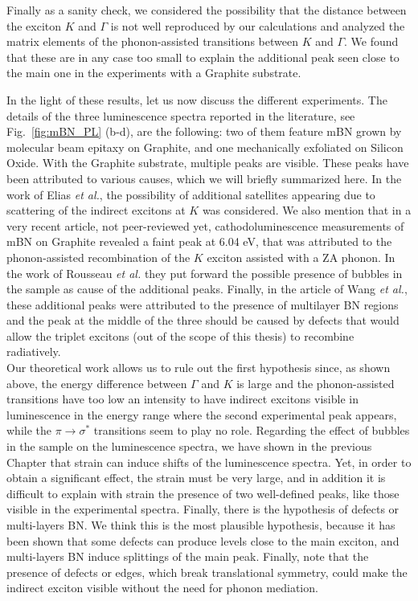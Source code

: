 Finally as a sanity check, we considered the possibility that the distance between the exciton $K$ and $\Gamma$ is not well reproduced by our calculations and analyzed the matrix elements of the phonon-assisted transitions between $K$ and $\Gamma$. We found that these are in any case too small to explain the additional peak seen close to the main one in the experiments with a Graphite substrate.

In the light of these results, let us now discuss the different experiments. The details of the three luminescence spectra reported in the literature, see Fig.~\ref{fig:mBN_PL} (b-d), are the following: two of them feature mBN grown by molecular beam epitaxy on Graphite,\cite{elias2019direct,wang2022scalable} and one mechanically exfoliated on Silicon Oxide.\cite{rousseau2021monolayer}
With the Graphite substrate, multiple peaks are visible.
These peaks have been attributed to various causes, which we will briefly summarized here. In the work of Elias \emph{et al.},\cite{elias2019direct} the possibility of additional satellites appearing due to scattering of the indirect excitons at $K$ was considered. We also mention that in a very recent article, not peer-reviewed yet,\cite{shima2023cathodoluminescence} cathodoluminescence measurements of mBN on Graphite revealed a faint peak at 6.04 eV, that was attributed to the phonon-assisted recombination of the $K$ exciton assisted with a ZA phonon.
In the work of Rousseau \emph{et al.}\cite{rousseau2021monolayer} they put forward the possible presence of bubbles in the sample as cause of the additional peaks. 
Finally, in the article of Wang \emph{et al.}\cite{wang2022scalable}, these additional peaks were attributed to the presence of multilayer BN regions and the peak at the middle of the three should be caused by defects that would allow the triplet excitons (out of the scope of this thesis) to recombine radiatively. \\


Our theoretical work allows us to rule out the first hypothesis since, as shown above, the energy difference between $\Gamma$ and $K$ is large and the phonon-assisted transitions have too low an intensity to have indirect excitons visible in luminescence in the energy range where the second experimental peak appears, while the $\pi\rightarrow\sigma^*$ transitions seem to play no role. Regarding the effect of bubbles in the sample on the luminescence spectra, we have shown in the previous Chapter that strain can induce shifts of the luminescence spectra.\cite{lechifflart2022excitons}
Yet, in order to obtain a significant effect, the strain must be very large, and in addition it is difficult to explain with strain the presence of two well-defined peaks, like those visible in the experimental spectra. 
Finally, there is the hypothesis of defects or multi-layers BN. We think this is the most plausible hypothesis, because it has been shown that some defects can produce levels close to the main exciton,\cite{attaccalite2011coupling} and multi-layers BN induce splittings of the main peak.\cite{paleari2018excitons} 
Finally, note that the presence of defects or edges, which break translational symmetry, could make the indirect exciton visible without the need for phonon mediation.\cite{feierabend2017proposal}


